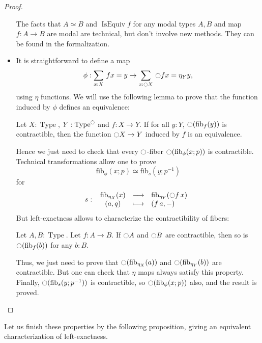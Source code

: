 \documentclass[notfinal]{jfrarticle}
\DeclareMathOperator{\Type}{Type}
\DeclareMathOperator{\IsEquiv}{IsEquiv}
\newcommand{\modal}{\ensuremath{\ocircle}}
\newcommand \fib[2] {\mathrm{fib}_{#1}(#2)}
\newcommand{\sumD}[3]{\sum_{#1:#2}\, #3}
\newcommand{\fonction}[5]{ %
	#1 \, \colon \left.
	 \begin{array}{ccl}
		#2 & \longrightarrow & #3 \\
		#4 & \longmapsto & #5
	\end{array}
	\right.
}
\begin{document}
\begin{proof}
\begin{itemize}
    The facts that $A\simeq B$ and $\IsEquiv f$ for any modal types
    $A,B$ and map $f:A\to B$ are modal are technical, but don't
    involve new methods. They can be found
    in the formalization.
  \item 
    It is straightforward to define a map
    \[ \phi:\sumD x X  {f x = y}\to
    \sumD x {\modal X} {\modal f x = \eta_Y y},\]
    using $\eta$ functions.
    We will use the following lemma to prove that the function induced
    by $\phi$ defines an equivalence:
    \begin{lem}
      Let $X:\Type$, $Y:\Type^\modal$ and $f:X\to Y$. If for all $y:Y$,
      $\modal (\fib f y)$ is contractible, then the function $\modal X
      \to Y$ induced by $f$ is an equivalence.
    \end{lem}
    Hence we just need to check that every $\modal$-fiber $\modal(\fib \phi {x;p})$ is contractible.
    Technical transformations allow one to prove
    \[ \fib\phi{x;p} \simeq \fib s {y;p^{-1}}\]
    for
    \[
    \fonction{s}{\fib{\eta_X}x}{\fib{\eta_Y}{\modal f\, x}}{(a,q)}{(f\, a,-)}
    \]
    But left-exactness allows to characterize the contractibility of fibers:
    \begin{lem}
      Let $A,B:\Type$. Let $f:A\to B$. If $\modal A$ and $\modal B$ are
      contractible, then so is $\modal(\fib f b)$ for any $b:B$.
    \end{lem}
    Thus, we just need to prove that $\modal(\fib {\eta_X} a)$ and
    $\modal(\fib {\eta_Y} b)$ are contractible. But one can check that
    $\eta$ maps always satisfy this property.
    Finally, $\modal(\fib s{y;p^{-1}})$ is contractible, so $\modal(\fib
    \phi {x;p})$ also, and the result is proved.
  \end{itemize}

\end{proof}

Let us finish these properties by the following proposition, giving
an equivalent characterization of left-exactness.
\end{document}
